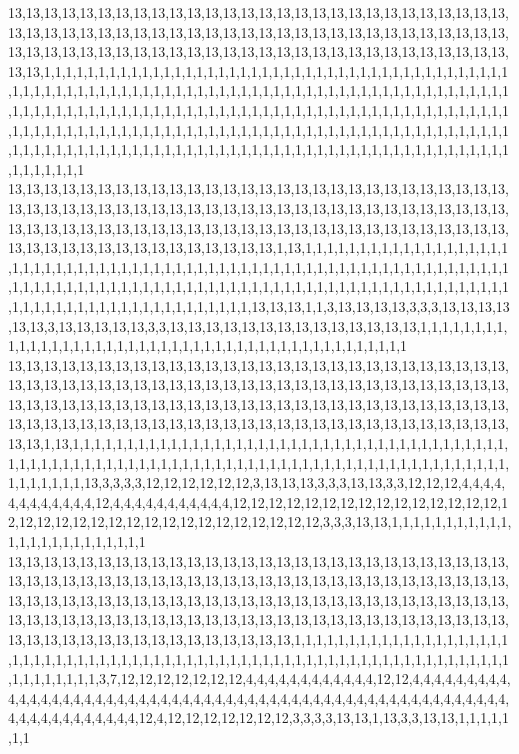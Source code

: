 13,13,13,13,13,13,13,13,13,13,13,13,13,13,13,13,13,13,13,13,13,13,13,13,13,13,13,13,13,13,13,13,13,13,13,13,13,13,13,13,13,13,13,13,13,13,13,13,13,13,13,13,13,13,13,13,13,13,13,13,13,13,13,13,13,13,13,13,13,13,13,13,13,13,13,13,13,13,13,13,13,13,13,13,13,13,1,1,1,1,1,1,1,1,1,1,1,1,1,1,1,1,1,1,1,1,1,1,1,1,1,1,1,1,1,1,1,1,1,1,1,1,1,1,1,1,1,1,1,1,1,1,1,1,1,1,1,1,1,1,1,1,1,1,1,1,1,1,1,1,1,1,1,1,1,1,1,1,1,1,1,1,1,1,1,1,1,1,1,1,1,1,1,1,1,1,1,1,1,1,1,1,1,1,1,1,1,1,1,1,1,1,1,1,1,1,1,1,1,1,1,1,1,1,1,1,1,1,1,1,1,1,1,1,1,1,1,1,1,1,1,1,1,1,1,1,1,1,1,1,1,1,1,1,1,1,1,1,1,1,1,1,1,1,1,1,1,1,1,1,1,1,1,1,1,1,1,1,1,1,1,1,1,1,1,1,1,1,1,1,1,1,1,1,1,1,1,1,1,1,1,1,1,1,1,1,1,1,1,1,1,1,1,1,1,1,1,1,1,1,1,1,1,1,1,1,1,1,1,1,1,1,1,1,1,1,1,1,1,1
13,13,13,13,13,13,13,13,13,13,13,13,13,13,13,13,13,13,13,13,13,13,13,13,13,13,13,13,13,13,13,13,13,13,13,13,13,13,13,13,13,13,13,13,13,13,13,13,13,13,13,13,13,13,13,13,13,13,13,13,13,13,13,13,13,13,13,13,13,13,13,13,13,13,13,13,13,13,13,13,13,13,13,13,13,13,13,13,13,13,13,13,13,13,13,13,13,13,13,1,13,1,1,1,1,1,1,1,1,1,1,1,1,1,1,1,1,1,1,1,1,1,1,1,1,1,1,1,1,1,1,1,1,1,1,1,1,1,1,1,1,1,1,1,1,1,1,1,1,1,1,1,1,1,1,1,1,1,1,1,1,1,1,1,1,1,1,1,1,1,1,1,1,1,1,1,1,1,1,1,1,1,1,1,1,1,1,1,1,1,1,1,1,1,1,1,1,1,1,1,1,1,1,1,1,1,1,1,1,1,1,1,1,1,1,1,1,1,1,1,1,1,1,1,1,1,1,1,1,1,1,1,1,1,13,13,13,1,1,3,13,13,13,13,3,3,3,13,13,13,13,13,13,3,13,13,13,13,13,3,3,13,13,13,13,13,13,13,13,13,13,13,13,13,13,1,1,1,1,1,1,1,1,1,1,1,1,1,1,1,1,1,1,1,1,1,1,1,1,1,1,1,1,1,1,1,1,1,1,1,1,1,1,1,1,1,1,1,1,1
13,13,13,13,13,13,13,13,13,13,13,13,13,13,13,13,13,13,13,13,13,13,13,13,13,13,13,13,13,13,13,13,13,13,13,13,13,13,13,13,13,13,13,13,13,13,13,13,13,13,13,13,13,13,13,13,13,13,13,13,13,13,13,13,13,13,13,13,13,13,13,13,13,13,13,13,13,13,13,13,13,13,13,13,13,13,13,13,13,13,13,13,13,13,13,13,13,13,13,13,13,13,13,13,13,13,13,13,13,13,13,13,13,13,1,13,1,1,1,1,1,1,1,1,1,1,1,1,1,1,1,1,1,1,1,1,1,1,1,1,1,1,1,1,1,1,1,1,1,1,1,1,1,1,1,1,1,1,1,1,1,1,1,1,1,1,1,1,1,1,1,1,1,1,1,1,1,1,1,1,1,1,1,1,1,1,1,1,1,1,1,1,1,1,1,1,1,1,1,1,1,1,1,1,1,1,1,1,1,13,3,3,3,3,12,12,12,12,12,12,3,13,13,13,3,3,3,13,13,3,3,12,12,12,4,4,4,4,4,4,4,4,4,4,4,4,12,4,4,4,4,4,4,4,4,4,4,4,12,12,12,12,12,12,12,12,12,12,12,12,12,12,12,12,12,12,12,12,12,12,12,12,12,12,12,12,12,12,12,12,12,3,3,3,13,13,1,1,1,1,1,1,1,1,1,1,1,1,1,1,1,1,1,1,1,1,1,1,1,1
13,13,13,13,13,13,13,13,13,13,13,13,13,13,13,13,13,13,13,13,13,13,13,13,13,13,13,13,13,13,13,13,13,13,13,13,13,13,13,13,13,13,13,13,13,13,13,13,13,13,13,13,13,13,13,13,13,13,13,13,13,13,13,13,13,13,13,13,13,13,13,13,13,13,13,13,13,13,13,13,13,13,13,13,13,13,13,13,13,13,13,13,13,13,13,13,13,13,13,13,13,13,13,13,13,13,13,13,13,13,13,13,13,13,13,13,13,13,13,13,13,13,13,13,13,13,13,13,1,1,1,1,1,1,1,1,1,1,1,1,1,1,1,1,1,1,1,1,1,1,1,1,1,1,1,1,1,1,1,1,1,1,1,1,1,1,1,1,1,1,1,1,1,1,1,1,1,1,1,1,1,1,1,1,1,1,1,1,1,1,1,1,1,1,1,1,1,1,1,1,1,1,3,7,12,12,12,12,12,12,12,4,4,4,4,4,4,4,4,4,4,4,4,12,12,4,4,4,4,4,4,4,4,4,4,4,4,4,4,4,4,4,4,4,4,4,4,4,4,4,4,4,4,4,4,4,4,4,4,4,4,4,4,4,4,4,4,4,4,4,4,4,4,4,4,4,4,4,4,4,4,4,4,4,4,4,4,4,4,4,4,4,12,4,12,12,12,12,12,12,12,3,3,3,3,13,13,1,13,3,3,13,13,1,1,1,1,1,1,1
